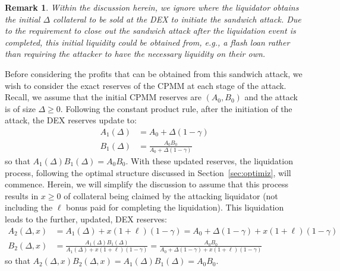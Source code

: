 \documentclass[11pt]{article} %
\newtheorem{remark}{Remark}
\begin{document}
%
\begin{remark}
Within the discussion herein, we ignore where the liquidator obtains the initial $\Delta$ collateral to be sold at the DEX to initiate the sandwich attack. Due to the requirement to close out the sandwich attack after the liquidation event is completed, this initial liquidity could be obtained from, e.g., a flash loan rather than requiring the attacker to have the necessary liquidity on their own.
\end{remark}
%
Before considering the profits that can be obtained from this sandwich attack, we wish to consider the exact reserves of the CPMM at each stage of the attack. Recall, we assume that the initial CPMM reserves are $(A_0,B_0)$ and the attack is of size $\Delta \geq 0$.
Following the constant product rule, after the initiation of the attack, the DEX reserves update to:
%
\begin{align*}
A_1(\Delta) &= A_0 + \Delta(1-\gamma) \\
B_1(\Delta) &= \frac{A_0 B_0}{A_0 + \Delta (1-\gamma)}
\end{align*}
%
so that $A_1(\Delta) B_1(\Delta) = A_0 B_0$.
With these updated reserves, the liquidation process, following the optimal structure discussed in Section~\ref{sec:optimiz}, will commence. Herein, we will simplify the discussion to assume that this process results in $x \geq 0$ of collateral being claimed by the attacking liquidator (not including the $\ell$ bonus paid for completing the liquidation). This liquidation leads to the further, updated, DEX reserves:
%
\begin{align*}
A_2(\Delta,x) &= A_1(\Delta) + x (1+\ell)(1-\gamma) = A_0 + \Delta (1-\gamma) + x (1+\ell)(1-\gamma)\\
B_2(\Delta,x) &= \frac{A_1(\Delta) B_1(\Delta)}{A_1(\Delta) + x (1+\ell)(1-\gamma)} = \frac{A_0 B_0}{A_0 + \Delta (1-\gamma) + x (1+\ell)(1-\gamma)}
\end{align*}
%
so that $A_2(\Delta,x) B_2(\Delta,x) = A_1(\Delta) B_1(\Delta) = A_0 B_0$.
\end{document}
